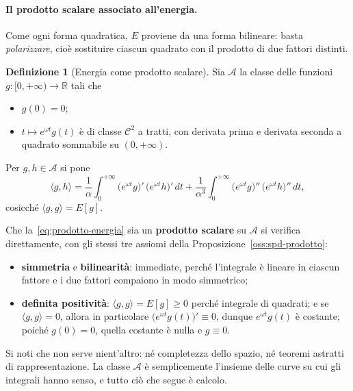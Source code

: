 \documentclass[11pt,a4paper]{article}
\theoremstyle{plain}
\theoremstyle{definition}
\newtheorem{definizione}[teorema]{Definizione}
\theoremstyle{remark}
\begin{document}
\paragraph{Il prodotto scalare associato all'energia.}
Come ogni forma quadratica, $E$ proviene da una forma bilineare: basta \emph{polarizzare},
cio\`e sostituire ciascun quadrato con il prodotto di due fattori distinti.

\begin{definizione}[Energia come prodotto scalare]
\label{def:prodotto-energia}
Sia $\mathcal{A}$ la classe delle funzioni $g:[0,+\infty)\to\mathbb{R}$ tali che
\begin{itemize}
  \item $g(0) = 0$;
  \item $t\mapsto e^{\omega t}g(t)$ \`e di classe $\mathcal{C}^2$ a tratti, con derivata prima
        e derivata seconda a quadrato sommabile su $(0,+\infty)$.
\end{itemize}
Per $g,h\in\mathcal{A}$ si pone
\begin{equation}
  \langle g,h\rangle
  = \frac{1}{\alpha}\int_0^{+\infty}\!\bigl(e^{\omega t}g\bigr)'\,\bigl(e^{\omega t}h\bigr)'\,dt
  + \frac{1}{\alpha^{3}}\int_0^{+\infty}\!\bigl(e^{\omega t}g\bigr)''\,\bigl(e^{\omega t}h\bigr)''\,dt ,
  \label{eq:prodotto-energia}
\end{equation}
cosicch\'e $\langle g,g\rangle = E[g]$.
\end{definizione}

Che la~\eqref{eq:prodotto-energia} sia un \textbf{prodotto scalare} su $\mathcal{A}$ si
verifica direttamente, con gli stessi tre assiomi della
Proposizione~\ref{oss:spd-prodotto}:
\begin{itemize}
  \item \textbf{simmetria} e \textbf{bilinearit\`a}: immediate, perch\'e l'integrale \`e
        lineare in ciascun fattore e i due fattori compaiono in modo simmetrico;
  \item \textbf{definita positivit\`a}: $\langle g,g\rangle = E[g]\ge 0$ perch\'e integrale di
        quadrati; e se $\langle g,g\rangle = 0$, allora in particolare
        $\bigl(e^{\omega t}g(t)\bigr)' \equiv 0$, dunque $e^{\omega t}g(t)$ \`e costante;
        poich\'e $g(0)=0$, quella costante \`e nulla e $g\equiv 0$.
\end{itemize}
Si noti che non serve nient'altro: n\'e completezza dello spazio, n\'e teoremi astratti di
rappresentazione. La classe $\mathcal{A}$ \`e semplicemente l'insieme delle curve su cui gli
integrali hanno senso, e tutto ci\`o che segue \`e calcolo.
\end{document}
